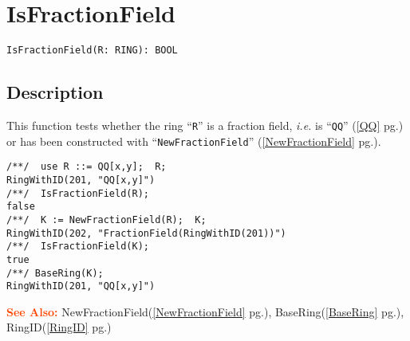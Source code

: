 \documentclass[a4paper]{mybook}
\newenvironment{command}{}{} %
\newcommand\SeeAlso{\par\textcolor{OrangeRed}{\textbf{\large See Also: }}}
\begin{document}
\section{IsFractionField}
\label{IsFractionField}
\begin{command} %


\begin{Verbatim}[label=syntax, rulecolor=\color{MidnightBlue},
frame=single]
IsFractionField(R: RING): BOOL
\end{Verbatim}


\subsection*{Description}

This function tests whether the ring ``\verb&R&'' is a fraction field,
\textit{i.e.} is ``\verb&QQ&'' (\ref{QQ} pg.\pageref{QQ}) or has been constructed with ``\verb&NewFractionField&'' (\ref{NewFractionField} pg.\pageref{NewFractionField}).
\begin{Verbatim}[label=example, rulecolor=\color{PineGreen}, frame=single]
/**/  use R ::= QQ[x,y];  R;
RingWithID(201, "QQ[x,y]")
/**/  IsFractionField(R);
false
/**/  K := NewFractionField(R);  K;
RingWithID(202, "FractionField(RingWithID(201))")
/**/  IsFractionField(K);
true
/**/ BaseRing(K);
RingWithID(201, "QQ[x,y]")
\end{Verbatim}


\SeeAlso %
  NewFractionField(\ref{NewFractionField} pg.\pageref{NewFractionField}), 
    BaseRing(\ref{BaseRing} pg.\pageref{BaseRing}), 
    RingID(\ref{RingID} pg.\pageref{RingID})
\end{command} %
\end{document}
